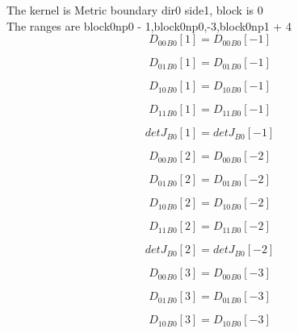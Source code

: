 \documentclass{article}
\begin{document}
\noindent The kernel is Metric boundary dir0 side1, block is 0\\\noindent The ranges are block0np0 - 1,block0np0,-3,block0np1 + 4\\\begin{dmath}{D_{00}{_{B0}}}[{1}] = {D_{00}{_{B0}}}[{-1}]\end{dmath}

\begin{dmath}{D_{01}{_{B0}}}[{1}] = {D_{01}{_{B0}}}[{-1}]\end{dmath}

\begin{dmath}{D_{10}{_{B0}}}[{1}] = {D_{10}{_{B0}}}[{-1}]\end{dmath}

\begin{dmath}{D_{11}{_{B0}}}[{1}] = {D_{11}{_{B0}}}[{-1}]\end{dmath}

\begin{dmath}{detJ{_{B0}}}[{1}] = {detJ{_{B0}}}[{-1}]\end{dmath}

\begin{dmath}{D_{00}{_{B0}}}[{2}] = {D_{00}{_{B0}}}[{-2}]\end{dmath}

\begin{dmath}{D_{01}{_{B0}}}[{2}] = {D_{01}{_{B0}}}[{-2}]\end{dmath}

\begin{dmath}{D_{10}{_{B0}}}[{2}] = {D_{10}{_{B0}}}[{-2}]\end{dmath}

\begin{dmath}{D_{11}{_{B0}}}[{2}] = {D_{11}{_{B0}}}[{-2}]\end{dmath}

\begin{dmath}{detJ{_{B0}}}[{2}] = {detJ{_{B0}}}[{-2}]\end{dmath}

\begin{dmath}{D_{00}{_{B0}}}[{3}] = {D_{00}{_{B0}}}[{-3}]\end{dmath}

\begin{dmath}{D_{01}{_{B0}}}[{3}] = {D_{01}{_{B0}}}[{-3}]\end{dmath}

\begin{dmath}{D_{10}{_{B0}}}[{3}] = {D_{10}{_{B0}}}[{-3}]\end{dmath}
\end{document}
